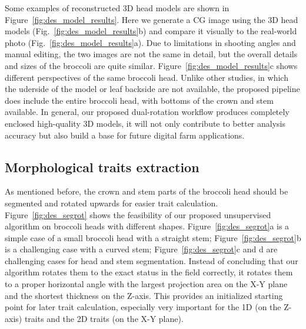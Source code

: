 

Some examples of reconstructed 3D head models are shown in Figure~\ref{fig:des_model_results}. Here we generate a CG image using the 3D head models (Fig.~\ref{fig:des_model_results}b) and compare it visually to the real-world photo (Fig.~\ref{fig:des_model_results}a). Due to limitations in shooting angles and manual editing, the two images are not the same in detail, but the overall details and sizes of the broccoli are quite similar. Figure~\ref{fig:des_model_results}c shows different perspectives of the same broccoli head. Unlike other studies, in which the uderside of the model \citep{kochi_3d_2018} or leaf backside \citep{cao_quantifying_2019} are not available, the proposed pipeline does include the entire broccoli head, with bottoms of the crown and stem available. In general, our proposed dual-rotation workflow produces completely enclosed high-quality 3D models, it will not only contribute to better analysis accuracy but also build a base for future digital farm applications.



\subsection{Morphological traits extraction}

As mentioned before, the crown and stem parts of the broccoli head should be segmented and rotated upwards for easier trait calculation. Figure~\ref{fig:des_segrot} shows the feasibility of our proposed unsupervised algorithm on broccoli heads with different shapes. Figure~\ref{fig:des_segrot}a is a simple case of a small broccoli head with a straight stem; Figure~\ref{fig:des_segrot}b is a challenging case with a curved stem;  Figure~\ref{fig:des_segrot}c and d are challenging cases for head and stem segmentation. Instead of concluding that our algorithm rotates them to the exact status in the field correctly, it rotates them to a proper horizontal angle with the largest projection area on the X-Y plane and the shortest thickness on the Z-axis. This provides an initialized starting point for later trait calculation, especially very important for the 1D (on the Z-axis) traits and the 2D traits (on the X-Y plane).



